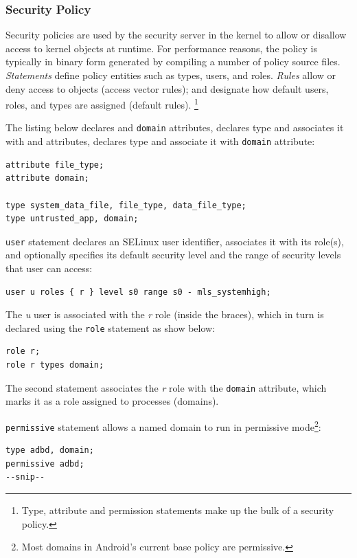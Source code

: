 \subsubsection{Security Policy}

Security policies are used by the security server in the kernel to allow or disallow access to kernel objects at runtime. For performance reasons, the policy is typically in binary form generated by compiling a number of policy source files. \textit{Statements} define policy entities such as types, users, and roles. \textit{Rules} allow or deny access to objects (access vector rules); and designate how default users, roles, and types are assigned (default rules). \footnote{Type, attribute and permission statements make up the bulk of a security policy.}

The listing below declares  and \texttt{domain} attributes, declares  type and associates it with  and  attributes, declares  type and associate it with \texttt{domain} attribute:
\begin{lstlisting}
attribute file_type;
attribute domain;

type system_data_file, file_type, data_file_type;
type untrusted_app, domain;
\end{lstlisting}

\texttt{user} statement declares an SELinux user identifier, associates it with its role(s), and optionally specifies its default security level and the range of security levels that user can access:
\begin{lstlisting}
user u roles { r } level s0 range s0 - mls_systemhigh;
\end{lstlisting}
The \textit{u} user is associated with the \textit{r} role (inside the braces), which in turn is declared using the \texttt{role} statement as show below:
\begin{lstlisting}
role r;
role r types domain;
\end{lstlisting}
The second statement associates the \textit{r} role with the \texttt{domain} attribute, which marks it as a role assigned to processes (domains).

\texttt{permissive} statement allows a named domain to run in permissive mode\footnote{Most domains in Android's current base policy are permissive.}:
\begin{lstlisting}
type adbd, domain;
permissive adbd;
--snip--
\end{lstlisting}


